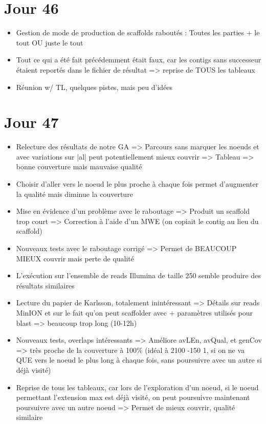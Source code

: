 \documentclass[12pt]{report}
\begin{document}
\section{Jour 46}

\begin{itemize}	
	\item Gestion de mode de production de scaffolds raboutés : Toutes les parties + le tout OU juste le tout
	
	\item Tout ce qui a été fait précédemment était faux, car les contigs sans successeur étaient reportés dans le fichier de résultat
	=> reprise de TOUS les tableaux
	
	\item Réunion w/ TL, quelques pistes, mais peu d'idées
\end{itemize}

\section{Jour 47}

\begin{itemize}
	\item Relecture des résultats de notre GA => Parcours sans marquer les noeuds et avec variations sur |al| peut potentiellement mieux couvrir => Tableau 
	=> bonne couverture mais mauvaise qualité
	
	\item Choisir d'aller vers le noeud le plus proche à chaque fois permet d'augmenter la qualité mais diminue la couverture
	
	\item Mise en évidence d'un problème avec le raboutage => Produit un scaffold trop court => Correction à l'aide d'un MWE 
	(on copiait le contig au lieu du scaffold)
	
	\item Nouveaux tests avec le raboutage corrigé => Permet de BEAUCOUP MIEUX couvrir mais perte de qualité
	
	\item L'exécution sur l'ensemble de reads Illumina de taille 250 semble produire des résultats similaires
		
	\item Lecture du papier de Karlsson, totalement inintéressant => Détails sur reads MinION et sur le fait qu'on peut scaffolder avec 
	+ paramètres utilisés pour blast => beaucoup trop long (10-12h)
	
	\item Nouveaux tests, overlaps intéressants => Améliore avLEn, avQual, et genCov => très proche de la couverture à 100\%
		  (idéal à 2100 -150 1, si on ne va QUE vers le noeud le plus long à chaque fois, sans poursuivre avec un autre si déjà visité)
		  
	\item Reprise de tous les tableaux, car lors de l'exploration d'un noeud, si le noeud permettant l'extension max est déjà visité, 
	on peut poursuivre maintenant poursuivre avec un autre noeud => Permet de mieux couvrir, qualité similaire
\end{itemize}
\end{document}
